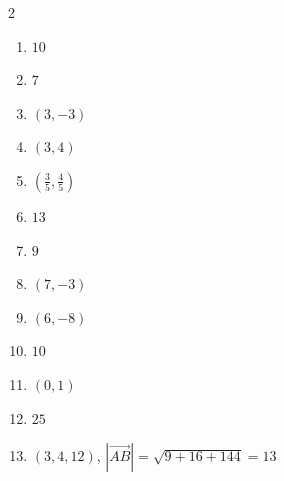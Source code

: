 \documentclass[11pt]{article}
\begin{document}
\begin{keybox}
\begin{multicols}{2}
\small
\begin{enumerate}[leftmargin=*,itemsep=3pt]
  \item $10$
  \item $7$
  \item $(3,-3)$
  \item $(3,4)$
  \item $(\tfrac35,\tfrac45)$
  \item $13$
  \item $9$
  \item $(7,-3)$
  \item $(6,-8)$
  \item $10$
  \item $(0,1)$
  \item $25$
  \item $(3,4,12)$, $|\vec{AB}|=\sqrt{9+16+144}=13$
\end{enumerate}
\end{multicols}
\end{keybox}
\end{document}

